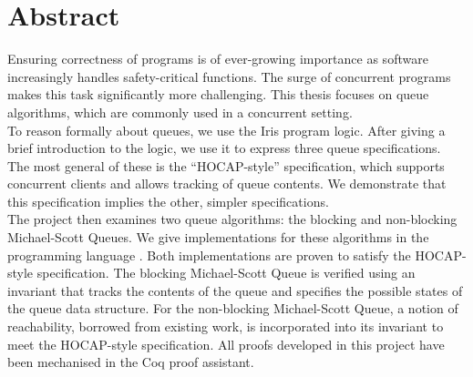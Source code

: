 \documentclass[a4paper, 10pt]{report}
\theoremstyle{definition}
\begin{document}

\pagestyle{empty}
\vspace*{\fill}
\clearpage


\pagestyle{plain}


\chapter*{Abstract}

Ensuring correctness of programs is of ever-growing importance as software increasingly handles safety-critical functions. The surge of concurrent programs makes this task significantly more challenging. This thesis focuses on queue algorithms, which are commonly used in a concurrent setting.\\
To reason formally about queues, we use the Iris program logic. After giving a brief introduction to the logic, we use it to express three queue specifications. The most general of these is the ``HOCAP-style'' specification, which supports concurrent clients and allows tracking of queue contents. We demonstrate that this specification implies the other, simpler specifications.\\
The project then examines two queue algorithms: the blocking and non-blocking Michael-Scott Queues. We give implementations for these algorithms in the programming language \heaplang{}. Both implementations are proven to satisfy the HOCAP-style specification. The blocking Michael-Scott Queue is verified using an invariant that tracks the contents of the queue and specifies the possible states of the queue data structure. For the non-blocking Michael-Scott Queue, a notion of reachability, borrowed from existing work, is incorporated into its invariant to meet the HOCAP-style specification. All proofs developed in this project have been mechanised in the Coq proof assistant.
\end{document}
